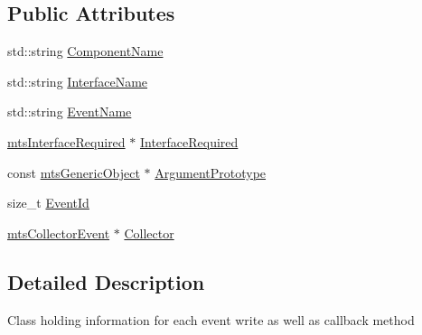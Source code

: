 \subsection*{Public Attributes}
\begin{DoxyCompactItemize}
\item 
std\-::string \hyperlink{classmts_collector_event_1_1_collector_event_write_afd3231863670f93fcbf5a514eabd320f}{Component\-Name}
\item 
std\-::string \hyperlink{classmts_collector_event_1_1_collector_event_write_a7f50054b5709dc9d12b073b45193c0c1}{Interface\-Name}
\item 
std\-::string \hyperlink{classmts_collector_event_1_1_collector_event_write_aa32519e39892386c15043154c5872ea5}{Event\-Name}
\item 
\hyperlink{classmts_interface_required}{mts\-Interface\-Required} $\ast$ \hyperlink{classmts_collector_event_1_1_collector_event_write_a4b474bb7e7316260c530ba3b496c78c3}{Interface\-Required}
\item 
const \hyperlink{classmts_generic_object}{mts\-Generic\-Object} $\ast$ \hyperlink{classmts_collector_event_1_1_collector_event_write_a1c7d71e7755790e25b4cc79b300ed89e}{Argument\-Prototype}
\item 
size\-\_\-t \hyperlink{classmts_collector_event_1_1_collector_event_write_a82781660173facd33329511a335a28e0}{Event\-Id}
\item 
\hyperlink{classmts_collector_event}{mts\-Collector\-Event} $\ast$ \hyperlink{classmts_collector_event_1_1_collector_event_write_aff7c6b5a034650d07c8748cef20fc06d}{Collector}
\end{DoxyCompactItemize}


\subsection{Detailed Description}
Class holding information for each event write as well as callback method 

